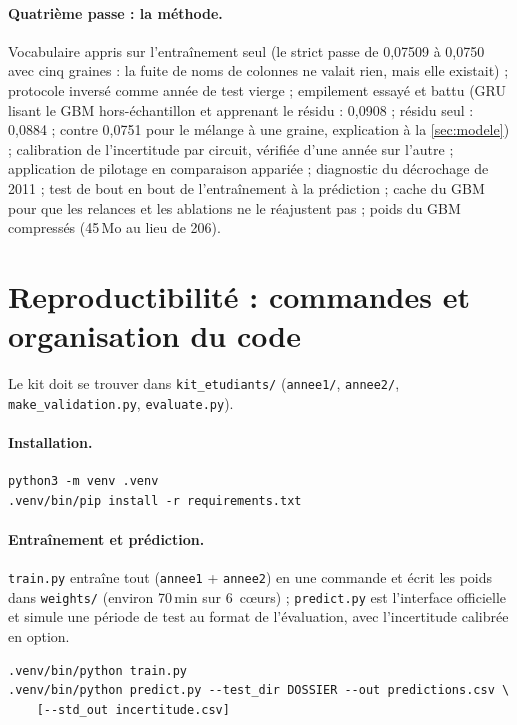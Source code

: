 \documentclass[11pt,a4paper]{article}
\begin{document}
\paragraph{Quatrième passe : la méthode.} Vocabulaire appris sur l'entraînement seul (le strict passe de 0,07509 à 0,0750 avec cinq graines : la fuite de noms de colonnes ne valait rien, mais elle existait) ; protocole inversé comme année de test vierge ; empilement essayé et battu (GRU lisant le GBM hors-échantillon et apprenant le résidu : 0,0908 ; résidu seul : 0,0884 ; contre 0,0751 pour le mélange à une graine, explication à la \autoref{sec:modele}) ; calibration de l'incertitude par circuit, vérifiée d'une année sur l'autre ; application de pilotage en comparaison appariée ; diagnostic du décrochage de 2011 ; test de bout en bout de l'entraînement à la prédiction ; cache du GBM pour que les relances et les ablations ne le réajustent pas ; poids du GBM compressés (45\,Mo au lieu de 206).

\section{Reproductibilité : commandes et organisation du code}\label{app:repro}

Le kit doit se trouver dans \texttt{kit\_etudiants/} (\texttt{annee1/}, \texttt{annee2/}, \texttt{make\_validation.py}, \texttt{evaluate.py}).

\paragraph{Installation.}
{\small
\begin{verbatim}
python3 -m venv .venv
.venv/bin/pip install -r requirements.txt
\end{verbatim}
}

\paragraph{Entraînement et prédiction.} \texttt{train.py} entraîne tout (\texttt{annee1} + \texttt{annee2}) en une commande et écrit les poids dans \texttt{weights/} (environ 70\,min sur 6~cœurs) ; \texttt{predict.py} est l'interface officielle et simule une période de test au format de l'évaluation, avec l'incertitude calibrée en option.
{\small
\begin{verbatim}
.venv/bin/python train.py
.venv/bin/python predict.py --test_dir DOSSIER --out predictions.csv \
    [--std_out incertitude.csv]
\end{verbatim}
}
\end{document}
